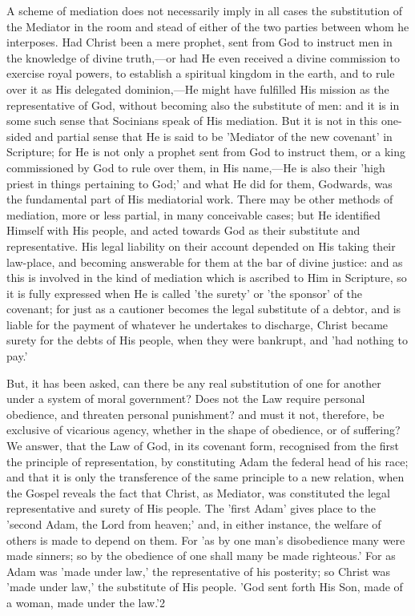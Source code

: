 \documentclass[
]{book}
\begin{document}
A scheme of mediation does not necessarily imply in all cases the substitution of the Mediator in the room and stead of either of the two parties between whom he interposes. Had Christ been a mere prophet, sent from God to instruct men in the knowledge of divine truth,---or had He even received a divine commission to exercise royal powers, to establish a spiritual kingdom in the earth, and to rule over it as His delegated dominion,---He might have fulfilled His mission as the representative of God, without becoming also the substitute of men: and it is in some such sense that Socinians speak of His mediation. But it is not in this one-sided and partial sense that He is said to be 'Mediator of the new covenant' in Scripture; for He is not only a prophet sent from God to instruct them, or a king commissioned by God to rule over them, in His name,---He is also their 'high priest in things pertaining to God;' and what He did for them, Godwards, was the fundamental part of His mediatorial work. There may be other methods of mediation, more or less partial, in many conceivable cases; but He identified Himself with His people, and acted towards God as their substitute and representative. His legal liability on their account depended on His taking their law-place, and becoming answerable for them at the bar of divine justice: and as this is involved in the kind of mediation which is ascribed to Him in Scripture, so it is fully expressed when He is called 'the surety' or 'the sponsor' of the covenant; for just as a cautioner becomes the legal substitute of a debtor, and is liable for the payment of whatever he undertakes to discharge, Christ became surety for the debts of His people, when they were bankrupt, and 'had nothing to pay.'

But, it has been asked, can there be any real substitution of one for another under a system of moral government? Does not the Law require personal obedience, and threaten personal punishment? and must it not, therefore, be exclusive of vicarious agency, whether in the shape of obedience, or of suffering? We answer, that the Law of God, in its covenant form, recognised from the first the principle of representation, by constituting Adam the federal head of his race; and that it is only the transference of the same principle to a new relation, when the Gospel reveals the fact that Christ, as Mediator, was constituted the legal representative and surety of His people. The 'first Adam' gives place to the 'second Adam, the Lord from heaven;' and, in either instance, the welfare of others is made to depend on them. For 'as by one man's disobedience many were made sinners; so by the obedience of one shall many be made righteous.' For as Adam was 'made under law,' the representative of his posterity; so Christ was 'made under law,' the substitute of His people. 'God sent forth His Son, made of a woman, made under the law.'2
\end{document}
